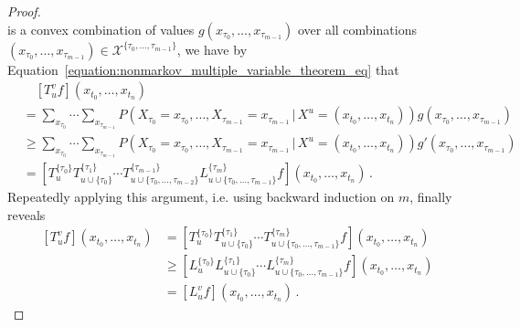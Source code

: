 \documentclass[10pt]{paper}
\newcommand{\states}{\mathcal{X}}
\begin{document}
\begin{proof}
\begin{equation*}
\end{equation*}
is a convex combination of values $g(x_{\tau_0},\ldots,x_{\tau_{m-1}})$ over all combinations $(x_{\tau_0},\ldots,x_{\tau_{m-1}})\in\states^{\{\tau_0,\ldots,\tau_{m-1}\}}$, we have by Equation~\ref{equation:nonmarkov_multiple_variable_theorem_eq} that
\begin{align*}
&\quad \left[T_u^vf\right](x_{t_0},\ldots,x_{t_n}) \\
&= \sum_{x_{\tau_0}}\cdots\sum_{x_{\tau_{m-1}}} P\left(X_{\tau_0}=x_{\tau_0},\ldots,X_{\tau_{m-1}}=x_{\tau_{m-1}}\,\vert\,X^u=(x_{t_0},\ldots,x_{t_n})\right)g(x_{\tau_0},\ldots,x_{\tau_{m-1}}) \\
&\geq \sum_{x_{\tau_0}}\cdots\sum_{x_{\tau_{m-1}}} P\left(X_{\tau_0}=x_{\tau_0},\ldots,X_{\tau_{m-1}}=x_{\tau_{m-1}}\,\vert\,X^u=(x_{t_0},\ldots,x_{t_n})\right)g'(x_{\tau_0},\ldots,x_{\tau_{m-1}}) \\
&= \left[T_u^{\{\tau_0\}}T_{u\cup\{\tau_0\}}^{\{\tau_1\}}\cdots T_{u\cup\{\tau_0,\ldots,\tau_{m-2}\}}^{\{\tau_{m-1}\}}L_{u\cup\{\tau_0,\ldots,\tau_{m-1}\}}^{\{\tau_m\}} f\right](x_{t_0},\ldots,x_{t_n})\,.
\end{align*}
Repeatedly applying this argument, i.e. using backward induction on $m$, finally reveals
\begin{align*}
\left[T_u^vf\right](x_{t_0},\ldots,x_{t_n}) &= \left[T_u^{\{\tau_0\}}T_{u\cup\{\tau_0\}}^{\{\tau_1\}}\cdots T_{u\cup\{\tau_0,\ldots,\tau_{m-1}\}}^{\{\tau_m\}} f\right](x_{t_0},\ldots,x_{t_n}) \\
 &\geq \left[L_u^{\{\tau_0\}}L_{u\cup\{\tau_0\}}^{\{\tau_1\}}\cdots L_{u\cup\{\tau_0,\ldots,\tau_{m-1}\}}^{\{\tau_m\}} f\right](x_{t_0},\ldots,x_{t_n}) \\
 &= \left[L_u^v f\right](x_{t_0},\ldots,x_{t_n})\,.
\end{align*}
\end{proof}
\end{document}

